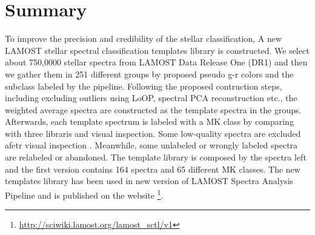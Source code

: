 \documentclass[referee]{raa}            %
\begin{document}
\section{Summary}
\label{sect:Summary}
To improve the precision  and credibility  of the stellar classification,
A new LAMOST stellar spectral classification templates library is constructed.
We select about 750,0000 stellar spectra from LAMOST Data Release One  (DR1) and then we gather them  in 251 different groups by proposed pseudo g-r colors and the subclass labeled by the pipeline.
Following the proposed contruction steps, including excluding outliers using LoOP, spectral PCA reconstruction etc.,
the weighted average spectra are constructed as the template spectra in the groups.
Afterwards, each template spectrum  is labeled with a MK  class by comparing with three libraris and visual inspection.
Some low-quality spectra are excluded afetr visual inspection .
Meanwhile, some unlabeled or wrongly labeled spectra are relabeled  or abandoned.
The template library is composed by the spectra left and the first version contains 164 spectra and 65 different MK classes.
The new templates library has been used in new version of LAMOST Spectra Analysis Pipeline and is published on the website \footnote{\url{http://sciwiki.lamost.org/lamost_sctl/v1}}.







%
%
\end{document}
